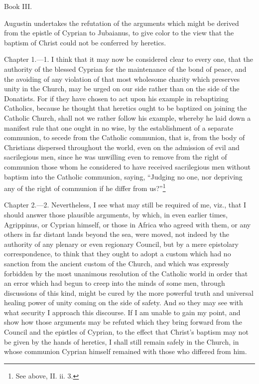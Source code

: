 Book III.

Augustin undertakes the refutation of the arguments which might be derived from the epistle of Cyprian to Jubaianus, to give color to the view that the baptism of Christ could not be conferred by heretics.


Chapter 1.—1. I think that it may now be considered clear to every one, that the authority of the blessed Cyprian for the maintenance of the bond of peace, and the avoiding of any violation of that most wholesome charity which preserves unity in the Church, may be urged on our side rather than on the side of the Donatists. For if they have chosen to act upon his example in rebaptizing Catholics, because he thought that heretics ought to be baptized on joining the Catholic Church, shall not we rather follow his example, whereby he laid down a manifest rule that one ought in no wise, by the establishment of a separate communion, to secede from the Catholic communion, that is, from the body of Christians dispersed throughout the world, even on the admission of evil and sacrilegious men, since he was unwilling even to remove from the right of communion those whom he considered to have received sacrilegious men without baptism into the Catholic communion, saying, ``Judging no one, nor depriving any of the right of communion if he differ from us?''\footnote{\par  See above, II. ii. 3.}


Chapter 2.—2. Nevertheless, I see what may still be required of me, viz., that I should answer those plausible arguments, by which, in even earlier times, Agrippinus, or Cyprian himself, or those in Africa who agreed with them, or any others in far distant lands beyond the sea, were moved, not indeed by the authority of any plenary or even regionary Council, but by a mere epistolary correspondence, to think that they ought to adopt a custom which had no sanction from the ancient custom of the Church, and which was expressly forbidden by the most unanimous resolution of the Catholic world in order that an error which had begun to creep into the minds of some men, through discussions of this kind, might be cured by the more powerful truth and universal healing power of unity coming on the side of safety. And so they may see with what security I approach this discourse. If I am unable to gain my point, and show how those arguments may be refuted which they bring forward from the Council and the epistles of Cyprian, to the effect that Christ’s baptism may not be given by the hands of heretics, I shall still remain safely in the Church, in whose communion Cyprian himself remained with those who differed from him.

